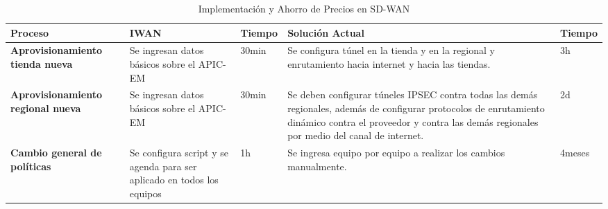 \begin{table}[ht]
\caption{Implementación y Ahorro de Precios en SD-WAN}
\label{tabla:autores}
\centering
\begin{tabular}{p{3.5cm} p{2.5cm} p{1.5cm} p{5cm} p{1.5cm}}
\hline
\textbf{Proceso} & \textbf{IWAN} & \textbf{Tiempo} & \textbf{Solución Actual} & \textbf{Tiempo}\\
\hline
\textbf{Aprovisionamiento tienda nueva} & Se ingresan datos básicos sobre el APIC-EM  & 30min & 
Se configura túnel en la tienda y en la regional y enrutamiento hacia internet y hacia las tiendas. & 3h \\
\hline
\textbf{Aprovisionamiento regional nueva} & Se ingresan datos básicos sobre el APIC-EM & 30min & 
Se deben configurar túneles IPSEC contra todas las demás regionales, además de configurar protocolos de enrutamiento dinámico contra el proveedor y contra las demás regionales por medio del canal de internet. & 2d \\
\hline
\textbf{Cambio general de políticas} & Se configura script y se agenda para ser aplicado en todos los equipos & 1h & 
Se ingresa equipo por equipo a realizar los cambios manualmente. & 4meses \\
\hline
\end{tabular}
\end{table}

